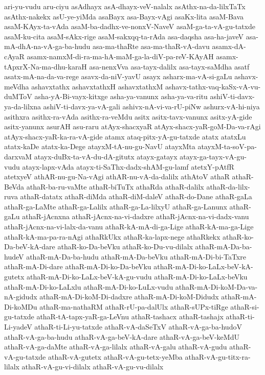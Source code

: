 {ari-yu-vudu
aru-ciyu
asAdhayx
asA-dhayx-veV-nalalx
asAthx-na-da-lilxTaTx
asAthx-nakekx
asU-ye-yiMda
asaBayx
asa-Bayx-vAgi
asaKx-lita
asaM-Bava
asaM-KAyx-ta-vAda
asaM-ba-dadhx-ve-nonxV-NaveV
asaM-ga-ta-vA-gu-tatxde
asaM-ku-cita
asaM-sAkx-rige
asaM-sakxqq-ta-rAda
asa-daqsha
asa-ha-javeV
asa-mA-dhA-na-vA-ga-ba-hudu
asa-ma-thaRte
asa-ma-thaR-vA-davu
asamx-dA-cAyaR
asamx-namxM-di-ra-ma-hA-maM-ga-la-diV-pa-reV-KAyAH
asamx-tApxrX-Na-ma-dhu-karaH
asa-nenxVva
asa-tayx-dalilx
asa-tayx-saMdha
asatf
asatx-mA-na-da-va-rege
asavx-da-niV-yavU
asayx
asharx-ma-vA-si-gaLu
ashavx-meVdha
ashavxtathx
ashavxtathxH
ashavxtathxM
ashavx-tathx-vaq-kaSx-vA-vu-duMToV
asha-yA-Bi-vayx-kitxge
asha-ya-vanunx
asha-ya-va-ritu
ashiV-ti-davx-ya-da-lilxna
ashiV-ti-davx-ya-vA-gali
ashivx-nA-vi-va-rU-piNw
ashurx-vA-hi-niya
asithxra
asithx-ra-vAda
asithx-ra-veMdu
asitx
asitx-tavx-vanunx
asitx-yA-gide
asitx-yanunx
asurAH
asu-raru
atAyx-shacxyaR
atAyx-shacx-yaR-goM-Da-va-rAgi
atAyx-shacx-yaR-ka-ra-vA-gide
atamx
ataq-pitx-yA-gu-tatxde
atatx
atatxLu
atatx-kaDe
atatx-ka-Dege
atayxM-tA-nu-gu-NavU
atayxMta
atayxM-ta-soV-pa-darxvaM
atayx-duBx-ta-vA-du-dA-gitutx
atayx-gatayx
atayx-ga-tayx-vA-gu-vudu
atayx-lapx-vAda
atayx-ti-SaThx-dadx-shAM-gu-lamf
atetxY-pAtfR
atetxyeV
athAR-nu-gu-Na-vAgi
athAR-nu-vA-da-dalilx
athAtoV
athaR
athaR-BeVda
athaR-ba-ru-vaMte
athaR-biTuTx
athaRda
athaR-dalilx
athaR-da-lilx-ruva
athaR-datatx
athaR-diMda
athaR-diM-daleV
athaR-do-Dane
athaR-gaLa
athaR-ga-LaMte
athaR-ga-Lalilx
athaR-ga-La-lilxyU
athaR-ga-Lanunx
athaR-gaLu
athaR-jAcnxna
athaR-jAcnx-na-vi-dadxre
athaR-jAcnx-na-vi-dadx-vanu
athaR-jAcnx-na-vi-lalx-da-vanu
athaR-kA-mA-di-ga-Lige
athaR-kA-ma-ga-Lige
athaR-kA-ma-pa-ra-nAgi
athaRkUkx
athaR-ka-lapx-nege
athaRkekx
athaR-ko-Da-beV-kA-dare
athaR-ko-Da-beVku
athaR-ko-Du-vu-dilalx
athaR-mA-Da-ba-hudeV
athaR-mA-Da-ba-hudu
athaR-mA-Da-beVku
athaR-mA-Di-bi-TaTxre
athaR-mA-Di-dare
athaR-mA-Di-ko-Da-beVku
athaR-mA-Di-ko-LaLx-beV-kA-gutetx
athaR-mA-Di-ko-LaLx-beV-kA-gu-vudu
athaR-mA-Di-ko-LaLx-beVku
athaR-mA-Di-ko-LaLxlu
athaR-mA-Di-ko-LuLx-vudu
athaR-mA-Di-koM-Da-va-nA-gidudx
athaR-mA-Di-koM-Di-dadxre
athaR-mA-Di-koM-Didudx
athaR-mA-Di-koMDu
athaR-ma-nathaRM
athaR-rU-pa-dalUlx
athaR-sUPx-tiRge
athaR-si-gu-tatxde
athaR-tA-tapx-yaR-ga-LeVnu
athaR-tashacx
athaR-tashajx
athaR-ti-Li-yadeV
athaR-ti-Li-yu-tatxde
athaR-vA-daSeTxV
athaR-vA-ga-ba-hudoV
athaR-vA-ga-ba-hudu
athaR-vA-ga-beV-kA-dare
athaR-vA-ga-beV-keMdU
athaR-vA-ga-daMte
athaR-vA-ga-lilalx
athaR-vA-galu
athaR-vA-gudu
athaR-vA-gu-tatxde
athaR-vA-gutetx
athaR-vA-gu-tetx-yeMba
athaR-vA-gu-titx-ra-lilalx
athaR-vA-gu-vi-dilalx
athaR-vA-gu-vu-dilalx
}
